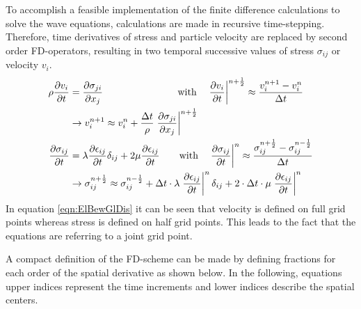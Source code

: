 \documentclass[pdftex,a4paper,parskip,listof=totoc,bibliography=totoc,onehalfspacing,12pt]{scrreprt}
\begin{document}
To accomplish a feasible implementation of the finite difference calculations to solve the wave equations, calculations are made in recursive time-stepping. Therefore, time derivatives of stress and particle velocity are replaced by second order FD-operators, resulting in two temporal successive values of stress $\sigma_{ij}$ or velocity $v_i$.
\begin{align}
	\rho \frac{\partial v_i}{\partial t} &= \frac{\partial \sigma_{ji}}{\partial x_j} \qquad \qquad \qquad \quad \,\,\,\, \text{with} \quad \left.\frac{\partial v_i}{\partial t}\right\rvert^{n+\frac{1}{2}} \approx \frac{v_i^{n+1} - v_i^{n}}{\Delta t}\notag\\
	&\rightarrow v_i^{n+1} \approx v_i^n + \frac{\Delta t}{\rho}  \left.\frac{\partial \sigma_{ji}}{\partial x_j}\right\rvert^{n+\frac{1}{2}}\label{eqn:ElBewGlDis}\\
	\frac{\partial \sigma_{ij}}{\partial t} &= \lambda \frac{\partial \epsilon_{ij}}{\partial t} \delta_{ij} + 2 \mu \frac{\partial \epsilon_{ij}}{\partial t} \qquad \text{with} \quad \left.\frac{\partial \sigma_{ij}}{\partial t}\right\rvert^n \approx \frac{\sigma_{ij}^{n+\frac{1}{2}} - \sigma_{ij}^{n-\frac{1}{2}}}{\Delta t}\notag\\
	&\rightarrow \sigma_{ij}^{n+\frac{1}{2}} \approx \sigma_{ij}^{n-\frac{1}{2}} + \Delta t \cdot \lambda \left.\frac{\partial \epsilon_{ij}}{\partial t}\right\rvert^n \delta_{ij} + 2 \cdot \Delta t \cdot \mu \left. \frac{\partial \epsilon_{ij}}{\partial t}\right\rvert^n
\end{align}
In equation \ref{eqn:ElBewGlDis} it can be seen that velocity is defined on full grid points whereas stress is defined on half grid points. This leads to the fact that the equations are referring to a joint grid point. 

A compact definition of the FD-scheme can be made by defining fractions for each order of the spatial derivative as shown below. 
In the following, equations upper indices represent the time increments and lower indices describe the spatial centers. 
\end{document}

